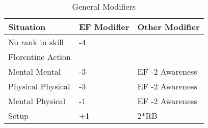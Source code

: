
\begin{table}[h]
\caption{General Modifiers}
\centering
	\begin{tabular}{||l||l|l||} \hline
	Situation			& EF Modifier	& Other Modifier \\ \hline
	No rank in skill 	& -4			& 				 \\
	Florentine Action	&				&					\\  \hline
	Mental Mental		& -3			& EF -2 Awareness \\
	Physical Physical	& -3			& EF -2 Awareness	\\
	Mental Physical		& -1			& EF -2 Awareness	\\
	Setup				& +1			& 2*RB			 \\ \hline
	\end{tabular}
\end{table}
